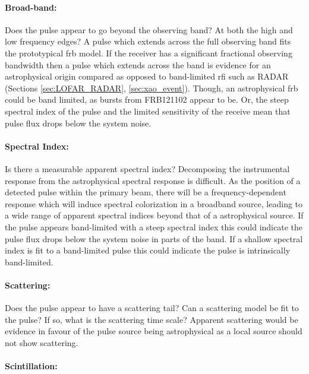 \documentclass[a4paper,fleqn,usenatbib]{mnras}
\begin{document}
\paragraph{Broad-band:}

Does the pulse appear to go beyond the observing band? At both the high and low
frequency edges? A pulse which extends across the full observing band fits the
prototypical \gls{frb} model. If the receiver has a significant fractional
observing bandwidth then a pulse which extends across the band is evidence for
an astrophysical origin compared as opposed to band-limited \gls{rfi} such as
RADAR (Sections \ref{sec:LOFAR_RADAR}, \ref{sec:xao_event}). Though, an
astrophysical \gls{frb} could be band limited, as bursts from FRB121102 appear
to be. Or, the steep spectral index of the pulse and the limited sensitivity of
the receive mean that pulse flux drops below the system noise.

\paragraph{Spectral Index:}

Is there a measurable apparent spectral index? Decomposing the instrumental
response from the astrophysical spectral response is difficult.  As the position
of a detected pulse within the primary beam, there will be a frequency-dependent
response which will induce spectral colorization in a broadband source, leading
to a wide range of apparent spectral indices beyond that of a astrophysical
source. If the pulse appears band-limited with a steep spectral index this could
indicate the pulse flux drops below the system noise in parts of the band. If a
shallow spectral index is fit to a band-limited pulse this could indicate the
pulse is intrinsically band-limited.

\paragraph{Scattering:}

Does the pulse appear to have a scattering tail? Can a scattering model be fit
to the pulse? If so, what is the scattering time scale? Apparent scattering
would be evidence in favour of the pulse source being astrophysical as a local
source should not show scattering.

\paragraph{Scintillation:}
\end{document}
